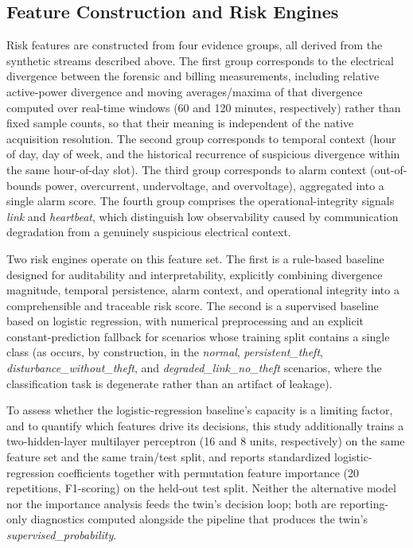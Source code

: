 \documentclass{ieeeaccess}
\begin{document}
\subsection{Feature Construction and Risk Engines}
Risk features are constructed from four evidence groups, all derived from the synthetic streams described above. The first group corresponds to the electrical divergence between the forensic and billing measurements, including relative active-power divergence and moving averages/maxima of that divergence computed over real-time windows (60 and 120 minutes, respectively) rather than fixed sample counts, so that their meaning is independent of the native acquisition resolution. The second group corresponds to temporal context (hour of day, day of week, and the historical recurrence of suspicious divergence within the same hour-of-day slot). The third group corresponds to alarm context (out-of-bounds power, overcurrent, undervoltage, and overvoltage), aggregated into a single alarm score. The fourth group comprises the operational-integrity signals \textit{link} and \textit{heartbeat}, which distinguish low observability caused by communication degradation from a genuinely suspicious electrical context.

Two risk engines operate on this feature set. The first is a rule-based baseline designed for auditability and interpretability, explicitly combining divergence magnitude, temporal persistence, alarm context, and operational integrity into a comprehensible and traceable risk score. The second is a supervised baseline based on logistic regression, with numerical preprocessing and an explicit constant-prediction fallback for scenarios whose training split contains a single class (as occurs, by construction, in the \textit{normal}, \textit{persistent\_theft}, \textit{disturbance\_without\_theft}, and \textit{degraded\_link\_no\_theft} scenarios, where the classification task is degenerate rather than an artifact of leakage).

To assess whether the logistic-regression baseline's capacity is a limiting factor, and to quantify which features drive its decisions, this study additionally trains a two-hidden-layer multilayer perceptron (16 and 8 units, respectively) on the same feature set and the same train/test split, and reports standardized logistic-regression coefficients together with permutation feature importance (20 repetitions, F1-scoring) on the held-out test split. Neither the alternative model nor the importance analysis feeds the twin's decision loop; both are reporting-only diagnostics computed alongside the pipeline that produces the twin's \textit{supervised\_probability}.
\end{document}

